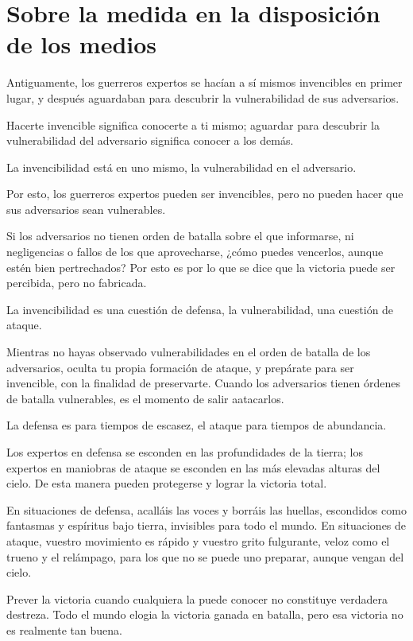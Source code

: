 \chapter{Sobre la medida en la disposición de los medios}

Antiguamente, los guerreros expertos se hacían a sí mismos invencibles en primer lugar, y después aguardaban para descubrir la vulnerabilidad de sus adversarios.

Hacerte invencible significa conocerte a ti mismo; aguardar para descubrir la vulnerabilidad del adversario significa conocer a los demás.

La invencibilidad está en uno mismo, la vulnerabilidad en el adversario.

Por esto, los guerreros expertos pueden ser invencibles, pero no pueden hacer que sus adversarios sean vulnerables.

Si los adversarios no tienen orden de batalla sobre el que informarse, ni negligencias o fallos de los que aprovecharse, ¿cómo puedes vencerlos, aunque estén bien pertrechados? Por esto es por lo que se dice que la victoria puede ser percibida, pero no fabricada.

La invencibilidad es una cuestión de defensa, la vulnerabilidad, una cuestión de ataque.

Mientras no hayas observado vulnerabilidades en el orden de batalla de los adversarios, oculta tu propia formación de ataque, y prepárate para ser invencible, con la finalidad de preservarte. Cuando los adversarios tienen órdenes de batalla vulnerables, es el momento de salir aatacarlos.

La defensa es para tiempos de escasez, el ataque para tiempos de abundancia.

Los expertos en defensa se esconden en las profundidades de la tierra; los expertos en maniobras de ataque se esconden en las más elevadas alturas del cielo. De esta manera pueden protegerse y lograr la victoria total.

En situaciones de defensa, acalláis las voces y borráis las huellas, escondidos como fantasmas y espíritus bajo tierra, invisibles para todo el mundo. En situaciones de ataque, vuestro movimiento es rápido y vuestro grito fulgurante, veloz como el trueno y el relámpago, para los que no se puede uno preparar, aunque vengan del cielo.

Prever la victoria cuando cualquiera la puede conocer no constituye verdadera destreza. Todo el mundo elogia la victoria ganada en batalla, pero esa victoria no es realmente tan buena.

